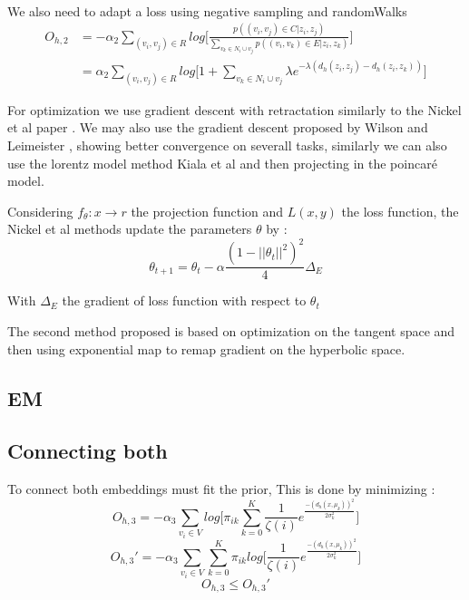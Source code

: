 \documentclass{article}
\begin{document}
            \paragraph{}
            We also need to adapt a loss using negative sampling and randomWalks
            \begin{align*}
                O_{h,2} &= - \alpha_2 \sum_{(v_i,v_j)\in R} log\Bigg[ \frac{p((v_i,v_j)\in C | z_i, z_j)}{\sum\limits_{v_k \in N_i \cup v_j}p((v_i,v_k)\in E | z_i, z_k)}\Bigg] \\
                  & = \alpha_2 \sum_{(v_i,v_j)\in R} log \Bigg[1 + \sum\limits_{v_k \in N_i \cup v_j} \lambda e^{-\lambda(d_h(z_i,z_j) - d_h(z_i,z_k))} \Bigg]
            \end{align*}

            For optimization we use gradient descent with retractation similarly to the Nickel et al paper \cite{poincareWTV}.
            We may also use the gradient descent proposed by Wilson and Leimeister \cite{PoincareGradient}, showing better convergence on severall tasks, similarly we can also use the lorentz model method Kiala et al \cite{LorentzEmbeddings} and then projecting in the poincaré model.

            Considering $f_\theta: x \rightarrow r $ the projection function and $L(x,y)$ the loss function, the Nickel et al methods update the parameters $\theta$ by :
            $$
                \theta_{t+1} = \theta_{t} - \alpha \frac{(1- ||\theta_t||^2)^2 }{4}\Delta_E
            $$

            With $\Delta_E$ the gradient of loss function with respect to $\theta_t$

            The second method proposed is based on optimization on the tangent space and then using exponential map to remap gradient on the hyperbolic space. 
            \subsection{EM}


            \subsection{Connecting both}
                
                To connect both embeddings must fit the prior,
                This is done by minimizing :
                $$
                    O_{h,3} = -\alpha_3   \sum_{v_i\in V} log\Bigg[ \pi_{ik}\sum \limits_{k=0}^K \frac{1}{\zeta(i)}e^{\frac{-(d_h(x,\mu_k))^2}{2\sigma_k^2}}\Bigg]
                $$
                $$
                    O_{h,3}' =-\alpha_3  \sum_{v_i\in V}  \sum \limits_{k=0}^K \pi_{ik} log\Bigg[\frac{1}{\zeta(i)}e^{\frac{-(d_h(x,\mu_k))^2}{2\sigma_k^2}}\Bigg]
                $$
                $$
                    O_{h,3} \leq O_{h,3}' 
                $$
\end{document}

